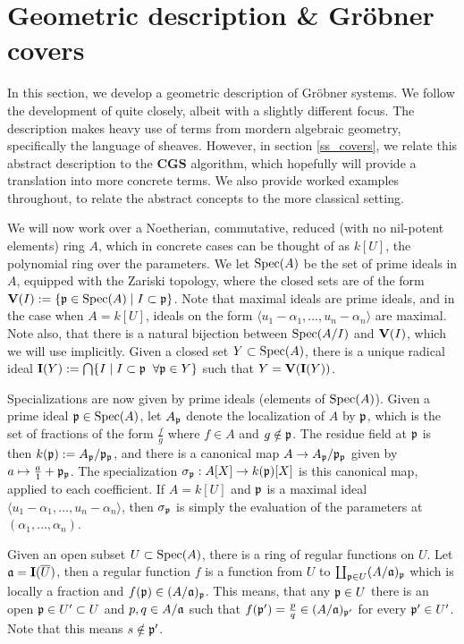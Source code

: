 
\section{Geometric description \& Gröbner covers} \label{sec:grb_covers}
In this section, we develop a geometric description of Gröbner systems. We follow the development of \cite{grb_covers} quite closely, albeit with a slightly different focus. The description makes heavy use of terms from mordern algebraic geometry, specifically the language of sheaves. However, in section \ref{ss_covers}, we relate this abstract description to the $\mathbf{CGS}$ algorithm, which hopefully will provide a translation into more concrete terms. We also provide worked examples throughout, to relate the abstract concepts to the more classical setting.

We will now work over a Noetherian, commutative, reduced (with no nil-potent elements) ring $A$, which in concrete cases can be thought of as $k[U]$, the polynomial ring over the parameters. We let $\operatorname{Spec}(A)$ be the set of prime ideals in $A$, equipped with the Zariski topology, where the closed sets are of the form $\operatorname{\mathbf V}(I) := \{\mathfrak p \in \operatorname{Spec}(A) \mid I \subset \mathfrak p\}$. Note that maximal ideals are prime ideals, and in the case when $A = k[U]$, ideals on the form $\langle u_{1} - \alpha_{1}, \dots, u_{n} - \alpha_{n} \rangle$ are maximal. Note also, that there is a natural bijection between $\operatorname{Spec}(A/I)$ and $\operatorname{\mathbf V}(I)$, which we will use implicitly. Given a closed set $Y \subset \operatorname{Spec}(A)$, there is a unique radical ideal $\operatorname{\mathbf I}(Y) := \bigcap\{I \mid I \subset \mathfrak p \;\; \forall \mathfrak p \in Y\}$ such that $Y = \operatorname{\mathbf V}(\operatorname{\mathbf I}(Y))$.

Specializations are now given by prime ideals (elements of $\operatorname{Spec}(A)$). Given a prime ideal $\mathfrak p \in \operatorname{Spec}(A)$, let $A_{\mathfrak p}$ denote the localization of $A$ by $\mathfrak p$, which is the set of fractions of the form $\frac{f}{g}$ where $f \in A$ and $g \notin \mathfrak p$. The residue field at $\mathfrak p$ is then $k(\mathfrak p) := A_{\mathfrak p}/\mathfrak p_{\mathfrak p}$, and there is a canonical map $A \to A_{\mathfrak p}/\mathfrak p_{\mathfrak p}$ given by $a \mapsto \frac a 1 + \mathfrak p_{\mathfrak p}$. The specialization $\sigma_{\mathfrak p} : A[X] \to k(\mathfrak p)[X]$ is this canonical map, applied to each coefficient. If $A = k[U]$ and $\mathfrak p$ is a maximal ideal $\langle u_{1} - \alpha_{1}, \dots, u_{n} - \alpha_{n} \rangle$, then $\sigma_{\mathfrak p}$ is simply the evaluation of the parameters at $(\alpha_{1}, \dots, \alpha_{n})$.

Given an open subset $U \subset \operatorname{Spec}(A)$, there is a ring of regular functions on $U$. Let $\mathfrak{a} = \operatorname{\mathbf I}(\overline U)$, then a regular function $f$ is a function from $U$ to $\coprod_{\mathfrak p \in U} (A/\mathfrak{a})_{\mathfrak p}$ which is locally a fraction and $f(\mathfrak p) \in (A/\mathfrak{a})_{\mathfrak p}$. This means, that any $\mathfrak p \in U$ there is an open $\mathfrak p \in U' \subset U$ and $p, q \in A/\mathfrak{a}$ such that $f(\mathfrak p') = \frac p q \in (A/\mathfrak{a})_{\mathfrak p'}$ for every $\mathfrak p' \in U'$. Note that this means $s \notin \mathfrak p'$.

